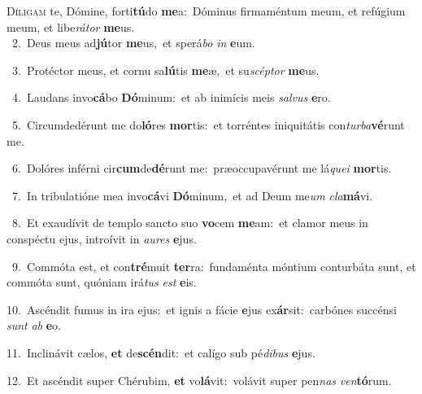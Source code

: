 \lettrine{\initial\textcolor{\initialcolor}{D}}{íligam} te, Dómine, forti\-\textbf{tú}\-do \textbf{me}\-a:~\star Dóminus firmaméntum meum, et refúgium meum, et libe\-\textit{rá}\-\textit{tor} \textbf{me}\-us.\\
{\numbfont\textcolor{\numbcolor}{~2.}}~Deus meus ad\-\textbf{jú}\-tor \textbf{me}\-us,~\star et sperá\textit{bo} \textit{in} \textbf{e}\-um.\par
{\numbfont\textcolor{\numbcolor}{~3.}}~Protéctor meus, et cornu sa\-\textbf{lú}\-tis \textbf{me}\-æ,~\star et su\-\textit{scép}\-\textit{tor} \textbf{me}\-us.\par
{\numbfont\textcolor{\numbcolor}{~4.}}~Laudans invo\-\textbf{cá}\-bo \textbf{Dó}\-minum:~\star et ab inimícis meis \textit{sal}\-\textit{vus} \textbf{e}\-ro.\par
{\numbfont\textcolor{\numbcolor}{~5.}}~Circumdedérunt me do\-\textbf{ló}\-res \textbf{mor}\-tis:~\star et torréntes iniquitátis con\-\textit{tur}\-\textit{ba}\textbf{vé}runt me.\par
{\numbfont\textcolor{\numbcolor}{~6.}}~Dolóres inférni cir\-\textbf{cum}\-de\-\textbf{dé}\-runt me:~\star præoccupavérunt me lá\-\textit{que}\-\textit{i} \textbf{mor}\-tis.\par
{\numbfont\textcolor{\numbcolor}{~7.}}~In tribulatióne mea invo\-\textbf{cá}\-vi \textbf{Dó}\-minum,~\star et ad Deum me\textit{um} \textit{cla}\-\textbf{má}vi.\par
{\numbfont\textcolor{\numbcolor}{~8.}}~Et exaudívit de templo sancto suo \textbf{vo}\-cem \textbf{me}\-am:~\star et clamor meus in conspéctu ejus, introívit in \textit{au}\-\textit{res} \textbf{e}\-jus.\par
{\numbfont\textcolor{\numbcolor}{~9.}}~Commóta est, et con\-\textbf{tré}\-muit \textbf{ter}\-ra:~\star fundaménta móntium conturbáta sunt, et commóta sunt, quóniam irá\textit{tus} \textit{est} \textbf{e}\-is.\par
{\numbfont\textcolor{\numbcolor}{10.}}~Ascéndit fumus in ira ejus:~\dagger et ignis a fácie \textbf{e}\-jus ex\-\textbf{ár}\-sit:~\star carbónes succénsi \textit{sunt} \textit{ab} \textbf{e}\-o.\par
{\numbfont\textcolor{\numbcolor}{11.}}~Inclinávit cælos, \textbf{et} de\-\textbf{scén}\-dit:~\star et calígo sub pé\-\textit{di}\-\textit{bus} \textbf{e}\-jus.\par
{\numbfont\textcolor{\numbcolor}{12.}}~Et ascéndit super Chérubim, \textbf{et} vo\-\textbf{lá}\-vit:~\star volávit super pen\textit{nas} \textit{ven}\-\textbf{tó}rum.\par
